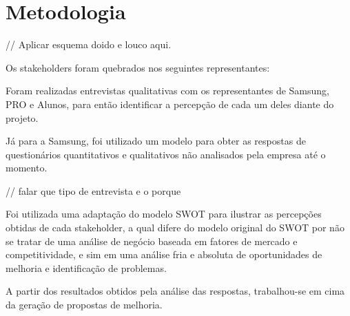 \chapter[Metodologia]{Metodologia}
\label{chap:metodologia}

// Aplicar esquema doido e louco aqui.

Os stakeholders foram quebrados nos seguintes representantes:

Foram realizadas entrevistas qualitativas com os representantes de Samsung, PRO e Alunos, para então identificar a percepção de cada um deles diante do projeto.

Já para a Samsung, foi utilizado um modelo para obter as respostas de questionários quantitativos e qualitativos não analisados pela empresa até o momento.

// falar que tipo de entrevista e o porque

Foi utilizada uma adaptação do modelo SWOT para ilustrar as percepções obtidas de cada stakeholder, a qual difere do modelo original do SWOT por não se tratar de uma análise de negócio baseada em fatores de mercado e competitividade, e sim em uma análise fria e absoluta de oportunidades de melhoria e identificação de problemas.

A partir dos resultados obtidos pela análise das respostas, trabalhou-se em cima da geração de propostas de melhoria.